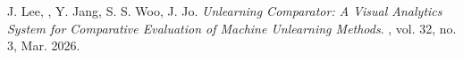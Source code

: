J. Lee, , Y. Jang, S. S. Woo, J. Jo. \textit{Unlearning Comparator: A Visual Analytics System for Comparative Evaluation of Machine Unlearning Methods}. , vol. 32, no. 3, Mar. 2026.\par
